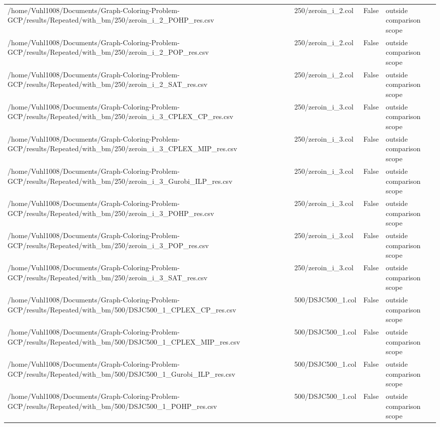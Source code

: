 \begin{table}[htbp]
\begin{tabular}{llll}
/home/Vuhl1008/Documents/Graph-Coloring-Problem-GCP/results/Repeated/with\_bm/250/zeroin\_i\_2\_POHP\_res.csv & 250/zeroin\_i\_2.col & False & outside comparison scope \\
/home/Vuhl1008/Documents/Graph-Coloring-Problem-GCP/results/Repeated/with\_bm/250/zeroin\_i\_2\_POP\_res.csv & 250/zeroin\_i\_2.col & False & outside comparison scope \\
/home/Vuhl1008/Documents/Graph-Coloring-Problem-GCP/results/Repeated/with\_bm/250/zeroin\_i\_2\_SAT\_res.csv & 250/zeroin\_i\_2.col & False & outside comparison scope \\
/home/Vuhl1008/Documents/Graph-Coloring-Problem-GCP/results/Repeated/with\_bm/250/zeroin\_i\_3\_CPLEX\_CP\_res.csv & 250/zeroin\_i\_3.col & False & outside comparison scope \\
/home/Vuhl1008/Documents/Graph-Coloring-Problem-GCP/results/Repeated/with\_bm/250/zeroin\_i\_3\_CPLEX\_MIP\_res.csv & 250/zeroin\_i\_3.col & False & outside comparison scope \\
/home/Vuhl1008/Documents/Graph-Coloring-Problem-GCP/results/Repeated/with\_bm/250/zeroin\_i\_3\_Gurobi\_ILP\_res.csv & 250/zeroin\_i\_3.col & False & outside comparison scope \\
/home/Vuhl1008/Documents/Graph-Coloring-Problem-GCP/results/Repeated/with\_bm/250/zeroin\_i\_3\_POHP\_res.csv & 250/zeroin\_i\_3.col & False & outside comparison scope \\
/home/Vuhl1008/Documents/Graph-Coloring-Problem-GCP/results/Repeated/with\_bm/250/zeroin\_i\_3\_POP\_res.csv & 250/zeroin\_i\_3.col & False & outside comparison scope \\
/home/Vuhl1008/Documents/Graph-Coloring-Problem-GCP/results/Repeated/with\_bm/250/zeroin\_i\_3\_SAT\_res.csv & 250/zeroin\_i\_3.col & False & outside comparison scope \\
/home/Vuhl1008/Documents/Graph-Coloring-Problem-GCP/results/Repeated/with\_bm/500/DSJC500\_1\_CPLEX\_CP\_res.csv & 500/DSJC500\_1.col & False & outside comparison scope \\
/home/Vuhl1008/Documents/Graph-Coloring-Problem-GCP/results/Repeated/with\_bm/500/DSJC500\_1\_CPLEX\_MIP\_res.csv & 500/DSJC500\_1.col & False & outside comparison scope \\
/home/Vuhl1008/Documents/Graph-Coloring-Problem-GCP/results/Repeated/with\_bm/500/DSJC500\_1\_Gurobi\_ILP\_res.csv & 500/DSJC500\_1.col & False & outside comparison scope \\
/home/Vuhl1008/Documents/Graph-Coloring-Problem-GCP/results/Repeated/with\_bm/500/DSJC500\_1\_POHP\_res.csv & 500/DSJC500\_1.col & False & outside comparison scope \\

\end{tabular}
\end{table}
